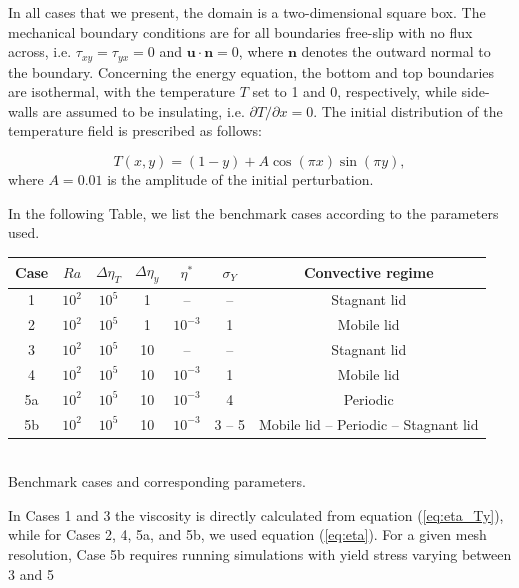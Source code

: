 In all cases that we present, the domain is a two-dimensional square box. The mechanical boundary conditions are for all boundaries free-slip with no flux across, i.e. $\tau_{xy}=\tau_{yx}=0$ and $\boldsymbol{u}\cdot \boldsymbol{n}=0$, where $\boldsymbol{n}$ denotes the outward normal to the boundary. Concerning the energy equation, the bottom and top boundaries are isothermal, with the temperature $T$ set to 1 and 0, respectively, while side-walls are assumed to be insulating, i.e. $\partial T/\partial x = 0$. The initial distribution of the temperature field is prescribed as follows:

\begin{equation}
T(x,y) = (1-y) + A \cos(\pi x)\sin(\pi y), \label{eq:initemp}
\end{equation}
where $A=0.01$ is the amplitude of the initial perturbation.


In the following Table, we list the benchmark cases according to the parameters used. 
\begin{center}
\begin{tabular}{c c c c c c c} 
\hline
Case & $Ra$ & $\Delta\eta_T$ & $\Delta\eta_y$ & $\eta^*$ & $\sigma_Y$ & Convective regime \\
\hline
1   & $10^2$ & $10^5$    & 1  & -- & --             & Stagnant lid    \\
2   & $10^2$ & $10^5$    & 1  & $10^{-3}$ & 1       & Mobile lid \\
3   & $10^2$ & $10^5$    & 10 & --  & --            & Stagnant lid \\
4   & $10^2$ & $10^5$    & 10 & $10^{-3}$ & 1       & Mobile lid  \\
5a  & $10^2$ & $10^5$    & 10 & $10^{-3}$ & 4       & Periodic  \\
5b  & $10^2$ & $10^5$    & 10 & $10^{-3}$ & 3 -- 5  & Mobile lid -- Periodic -- Stagnant lid \\
\hline
\end{tabular}\\
{\small Benchmark cases and corresponding parameters.} 
\end{center}

In Cases 1 and 3 the viscosity is directly calculated from equation (\ref{eq:eta_Ty}), while for Cases 2, 4, 5a, and 5b, we used equation (\ref{eq:eta}). For a given mesh resolution, Case 5b requires running simulations with yield stress varying between 3 and 5


